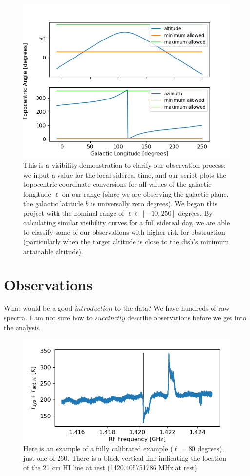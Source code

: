 \documentclass[12pt]{article}
\begin{document}
\begin{figure}
	\centering
	\includegraphics[width=.75\linewidth]{1940_10_05_2020}
	\caption{This is a visibility demonstration to clarify our observation process: we input a value for the local sidereal time, and our script plots the topocentric coordinate conversions for all values of the galactic longitude $\ell$ on our range (since we are observing the galactic plane, the galactic latitude $b$ is universally zero degrees). We began this project with the nominal range of $\ell \in [-10, 250]$ degrees. By calculating similar visibility curves for a full sidereal day, we are able to classify some of our observations with higher risk for obstruction (particularly when the target altitude is close to the dish's minimum attainable altitude).}
	\label{fig:vis_demo}
\end{figure}

\section{Observations}

\quad \quad What would be a good $introduction$ to the data? We have hundreds of raw spectra. I am not sure how to $succinctly$ describe observations before we get into the analysis.

\begin{figure}
	\centering
	\includegraphics[width=.8\linewidth]{cal_ex_80_deg}
	\caption{Here is an example of a fully calibrated example ($\ell = 80$ degrees), just one of 260. There is a black vertical line indicating the location of the 21 cm HI line at rest (1420.405751786 MHz at rest).}
	\label{fig:cal_ex}
\end{figure}
\end{document}
